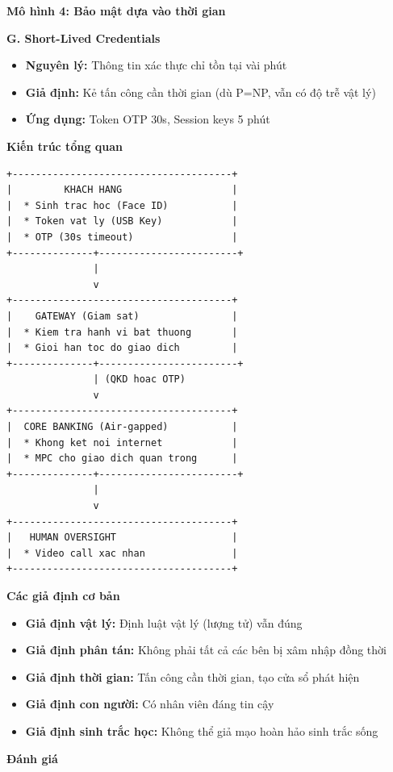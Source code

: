 \textbf{Mô hình 4: Bảo mật dựa vào thời gian}

\textbf{G. Short-Lived Credentials}
\begin{itemize}
    \item \textbf{Nguyên lý:} Thông tin xác thực chỉ tồn tại vài phút
    \item \textbf{Giả định:} Kẻ tấn công cần thời gian (dù P=NP, vẫn có độ trễ vật lý)
    \item \textbf{Ứng dụng:} Token OTP 30s, Session keys 5 phút
\end{itemize}

\textbf{Kiến trúc tổng quan}

\begin{verbatim}
+--------------------------------------+
|         KHACH HANG                   |
|  * Sinh trac hoc (Face ID)           |
|  * Token vat ly (USB Key)            |
|  * OTP (30s timeout)                 |
+--------------+------------------------+
               |
               v
+--------------------------------------+
|    GATEWAY (Giam sat)                |
|  * Kiem tra hanh vi bat thuong       |
|  * Gioi han toc do giao dich         |
+--------------+------------------------+
               | (QKD hoac OTP)
               v
+--------------------------------------+
|  CORE BANKING (Air-gapped)           |
|  * Khong ket noi internet            |
|  * MPC cho giao dich quan trong      |
+--------------+------------------------+
               |
               v
+--------------------------------------+
|   HUMAN OVERSIGHT                    |
|  * Video call xac nhan               |
+--------------------------------------+
\end{verbatim}

\textbf{Các giả định cơ bản}
\begin{itemize}
    \item \textbf{Giả định vật lý:} Định luật vật lý (lượng tử) vẫn đúng
    \item \textbf{Giả định phân tán:} Không phải tất cả các bên bị xâm nhập đồng thời
    \item \textbf{Giả định thời gian:} Tấn công cần thời gian, tạo cửa sổ phát hiện
    \item \textbf{Giả định con người:} Có nhân viên đáng tin cậy
    \item \textbf{Giả định sinh trắc học:} Không thể giả mạo hoàn hảo sinh trắc sống
\end{itemize}

\textbf{Đánh giá}

